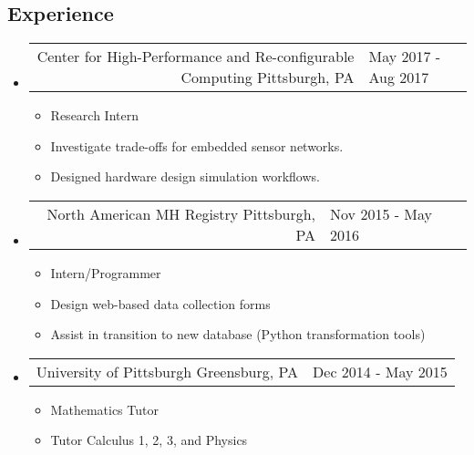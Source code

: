 \documentclass[18pt]{article}
\makeatletter
\providecommand{\tightlist}{
    \setlength{\itemsep}{0pt}\setlength{\parskip}{0pt}
}
\providecommand{\datetable}[2]{
    \begin{tabular*}{\textwidth}{r @{\extracolsep{\fill}} l}
        #1 & #2
    \end{tabular*}
}
\makeatother
\begin{document}
    \subsection*{Experience}\label{experience}
      \begin{itemize}\tightlist
        
        \item
        \datetable
            {Center for High-Performance and Re-configurable Computing \textbar{} Pittsburgh, PA}
            {May 2017 - Aug 2017}
        \begin{itemize}\tightlist
          \item Research Intern
          \item Investigate trade-offs for embedded sensor networks.
          \item Designed hardware design simulation workflows.
      	\end{itemize}
        
        \item
        \datetable
            {North American MH Registry \textbar{} Pittsburgh, PA}
            {Nov 2015 - May 2016}
        \begin{itemize}\tightlist
          \item Intern/Programmer
          \item Design web-based data collection forms
          \item Assist in transition to new database (Python transformation tools)
        \end{itemize}

        \item \datetable
            {University of Pittsburgh \textbar{} Greensburg, PA}
            {Dec 2014 - May 2015}
        \begin{itemize}\tightlist
          \item Mathematics Tutor
          \item Tutor Calculus 1, 2, 3, and Physics
        \end{itemize}
        

      \end{itemize} %
      
\end{document}

